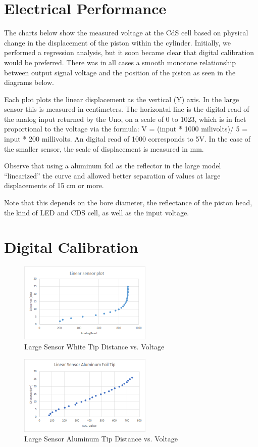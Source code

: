 \documentclass[10pt,conference,compsocconf]{IEEEtran}
\begin{document}
\section{Electrical Performance}

The charts below show the measured voltage at the CdS cell based on physical change in the displacement of the piston within the cylinder. Initially, we performed a regression analysis, but it soon became clear that digital calibration would be preferred. There was in all cases a smooth monotone relationship between output signal voltage and the position of the piston as seen in the diagrams below. 

Each plot plots the linear displacement as the vertical (Y) axis. In the large sensor this is measured in centimeters. The horizontal line is the digital read of the analog input returned by the Uno, on a scale of 0 to 1023, which is in fact proportional to the voltage via the formula: V = (input * 1000 milivolts)/ 5 = input * 200 millivolts. An digital read of 1000 corresponds to 5V. In the case of the smaller sensor, the scale of displacement is measured in mm.

Observe that using a aluminum foil as the reflector in the large model “linearized” the curve and allowed better separation of values at large displacements of 15 cm or more.

Note that this depends on the bore diameter, the reflectance of the piston head, the kind of LED and CDS cell, as well as the input voltage.

\section{Digital Calibration}

\begin{figure}
  \centering
  \includegraphics[width=2.5in]{figures/WhiteLargeDistanceVsRead.png}
  \caption{Large Sensor White Tip Distance vs. Voltage}  
\end{figure}

\begin{figure}
  \centering
  \includegraphics[width=2.5in]{figures/AluminumLargeFoil.png}
  \caption{Large Sensor Aluminum Tip Distance vs. Voltage}  
\end{figure}
\end{document}
